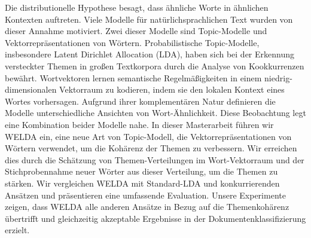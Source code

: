 \documentclass[
        a4paper,
        titlepage,
        twoside,
        parskip,
        numbers=noenddot
        ]{scrbook}
\theoremstyle{break}
\begin{document}
Die distributionelle Hypothese besagt, dass ähnliche Worte in ähnlichen Kontexten auftreten.
Viele Modelle für natürlichsprachlichen Text wurden von dieser Annahme motiviert.
Zwei dieser Modelle sind Topic-Modelle und Vektorrepräsentationen von Wörtern.
Probabilistische Topic-Modelle, insbesondere Latent Dirichlet Allocation (LDA), haben sich bei der Erkennung versteckter Themen in großen Textkorpora durch die Analyse von Kookkurrenzen bewährt.
Wortvektoren lernen semantische Regelmäßigkeiten in einem niedrig-dimensionalen Vektorraum zu kodieren, indem sie den lokalen Kontext eines Wortes vorhersagen.
Aufgrund ihrer komplementären Natur definieren die Modelle unterschiedliche Ansichten von Wort-Ähnlichkeit.
Diese Beobachtung legt eine Kombination beider Modelle nahe.
In dieser Masterarbeit führen wir WELDA ein, eine neue Art von Topic-Modell, die Vektorrepräsentationen von Wörtern verwendet, um die Kohärenz der Themen zu verbessern.
Wir erreichen dies durch die Schätzung von Themen-Verteilungen im Wort-Vektorraum und der Stichprobennahme neuer Wörter aus dieser Verteilung, um die Themen zu stärken.
Wir vergleichen WELDA mit Standard-LDA und konkurrierenden Ansätzen und präsentieren eine umfassende Evaluation.
Unsere Experimente zeigen, dass WELDA alle anderen Ansätze in Bezug auf die Themenkohärenz übertrifft und gleichzeitig akzeptable Ergebnisse in der Dokumentenklassifizierung erzielt.

\@openrighttrue
\makeatother

\setcounter{secnumdepth}{4}
\setcounter{tocdepth}{4}
\tableofcontents
\end{document}
